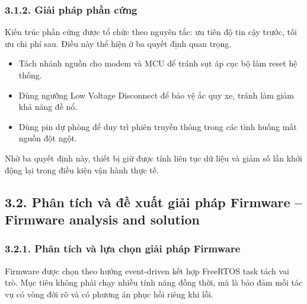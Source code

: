 \documentclass[a4paper]{extarticle}
\providecommand{\tightlist}{%
  \setlength{\itemsep}{0pt}\setlength{\parskip}{0pt}}
\begin{document}
\subsubsection{3.1.2. Giải pháp phần cứng}

Kiến trúc phần cứng được tổ chức theo nguyên tắc: ưu tiên độ tin cậy trước, tối ưu chi phí sau. Điều này thể hiện ở ba quyết định quan trọng.

\begin{itemize}
\tightlist
\item
  Tách nhánh nguồn cho modem và MCU để tránh sụt áp cục bộ làm reset hệ thống.
\item
  Dùng ngưỡng Low Voltage Disconnect để bảo vệ ắc quy xe, tránh làm giảm khả năng đề nổ.
\item
  Dùng pin dự phòng để duy trì phiên truyền thông trong các tình huống mất nguồn đột ngột.
\end{itemize}

Nhờ ba quyết định này, thiết bị giữ được tính liên tục dữ liệu và giảm số lần khởi động lại trong điều kiện vận hành thực tế.

\subsection{3.2. Phân tích và đề xuất giải pháp Firmware -- Firmware analysis and solution}

\subsubsection{3.2.1. Phân tích và lựa chọn giải pháp Firmware}

Firmware được chọn theo hướng event-driven kết hợp FreeRTOS task tách vai trò. Mục tiêu không phải chạy nhiều tính năng đồng thời, mà là bảo đảm mỗi tác vụ có vòng đời rõ và có phương án phục hồi riêng khi lỗi.
\end{document}
